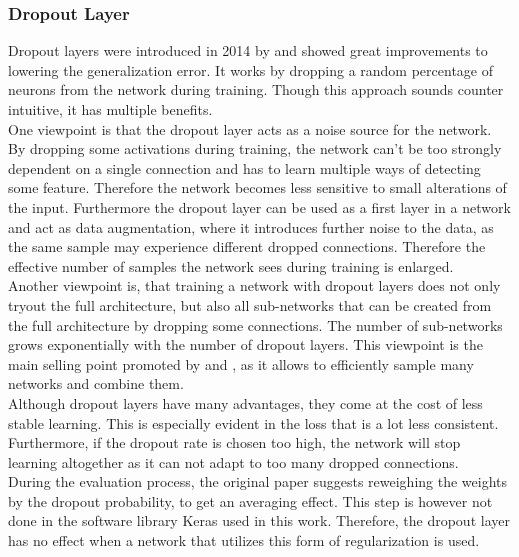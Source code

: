 \subsubsection{Dropout Layer}
Dropout layers were introduced in 2014 by \cite{dropout_invention} and showed great improvements to lowering the generalization error. It works by dropping a random percentage of neurons from the network during training. Though this approach sounds counter intuitive, it has multiple benefits.\\
One viewpoint is that the dropout layer acts as a noise source for the network. By dropping some activations during training, the network can't be too strongly dependent on a single connection and has to learn multiple ways of detecting some feature. Therefore the network becomes less sensitive to small alterations of the input. Furthermore the dropout layer can be used as a first layer in a network and act as data augmentation, where it introduces further noise to the data, as  the same sample may experience different dropped connections. Therefore the effective number of samples the network sees during training is enlarged.\\
Another viewpoint is, that training a network with dropout layers does not only tryout the full architecture, but also all sub-networks that can be created from the full architecture by dropping some connections. The number of sub-networks grows exponentially with the number of dropout layers. This viewpoint is the main selling point promoted by \cite{deep_learning_book} and \cite{dropout_invention}, as it allows to efficiently sample many networks and combine them.\medskip\\
Although dropout layers have many advantages, they come at the cost of less stable learning. This is especially evident in the loss that is a lot less consistent. Furthermore, if the dropout rate is chosen too high, the network will stop learning altogether as it can not adapt to too many dropped connections.\medskip\\
During the evaluation process, the original paper \cite{dropout_invention} suggests reweighing the weights by the dropout probability, to get an averaging effect. This step is however not done in the software library Keras used in this work. Therefore, the dropout layer has no effect when a network that utilizes this form of regularization is used.
